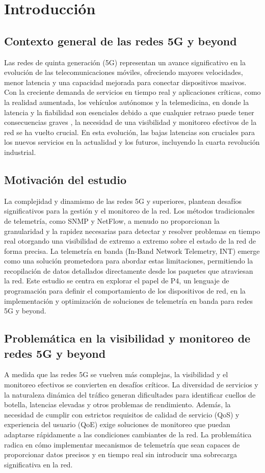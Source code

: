\chapter{Introducción}
\section{Contexto general de las redes 5G y beyond}
Las redes de quinta generación (5G) representan un avance significativo en la evolución de las telecomunicaciones móviles, ofreciendo mayores velocidades, menor latencia y una capacidad mejorada para conectar dispositivos masivos.
 Con la creciente demanda de servicios en tiempo real y aplicaciones críticas, como la realidad aumentada, los vehículos autónomos y la telemedicina, en donde la latencia y la fiabilidad son esenciales debido a que cualquier retraso puede tener consecuencias graves \cite{sachs2018adaptive}, la necesidad de una visibilidad y monitoreo efectivos de la red se ha vuelto crucial. En esta evolución, las bajas latencias son cruciales para los nuevos servicios en la actualidad y los futuros, incluyendo la cuarta revolución industrial.
 \section{Motivación del estudio}
La complejidad y dinamismo de las redes 5G y superiores, plantean desafíos significativos para la gestión y el monitoreo de la red. Los métodos tradicionales de telemetría, como SNMP y NetFlow, a menudo no proporcionan la granularidad y la rapidez necesarias para detectar y 
resolver problemas en tiempo real otorgando una visibilidad de extremo a extremo sobre el estado de la red de forma precisa. La telemetría en banda (In-Band Network Telemetry, INT) emerge como una solución prometedora para abordar estas limitaciones, permitiendo la recopilación de datos detallados directamente desde los paquetes que atraviesan la red. Este estudio se centra en explorar el papel de P4, un lenguaje de programación para definir el comportamiento de los dispositivos de red, en la implementación y optimización de soluciones de telemetría en banda para redes 5G y beyond.
\section{Problemática en la visibilidad y monitoreo de redes 5G y beyond}
A medida que las redes 5G se vuelven más complejas, la visibilidad y el monitoreo efectivos se convierten en desafíos críticos. La diversidad de servicios y la naturaleza dinámica del tráfico generan dificultades para identificar cuellos de botella, latencias elevadas y otros problemas de rendimiento. Además, la necesidad de cumplir con estrictos requisitos de calidad de servicio (QoS) y experiencia del usuario (QoE) exige soluciones de monitoreo que puedan adaptarse rápidamente a las condiciones cambiantes de la red. La problemática radica en cómo implementar mecanismos de telemetría que sean capaces de proporcionar datos precisos y en tiempo real sin introducir una sobrecarga significativa en la red.
